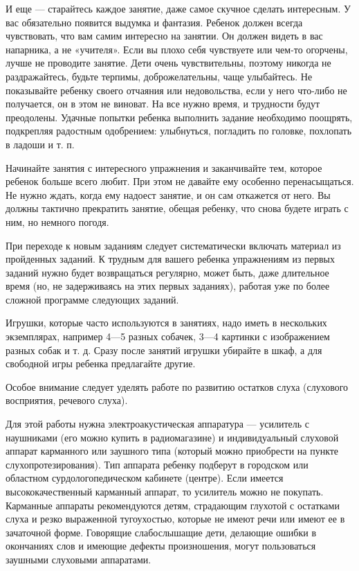 \documentclass{book}
\begin{document}
И еще --- старайтесь каждое занятие, даже самое скучное сделать
интересным. У вас обязательно появится выдумка и фантазия. Ребенок
должен всегда чувствовать, что вам самим интересно на занятии. Он должен
видеть в вас напарника, а не «учителя». Если вы плохо себя чувствуете
или чем-то огорчены, лучше не проводите занятие. Дети очень
чувствительны, поэтому никогда не раздражайтесь, будьте терпимы,
доброжелательны, чаще улыбайтесь. Не показывайте ребенку своего отчаяния
или недовольства, если у него что-либо не получается, он в этом не
виноват. На все нужно время, и трудности будут преодолены. Удачные
попытки ребенка выполнить задание необходимо поощрять, подкрепляя
радостным одобрением: улыбнуться, погладить по головке, похлопать в
ладоши и т. п.

Начинайте занятия с интересного упражнения и заканчивайте тем, которое
ребенок больше всего любит. При этом не давайте ему особенно
перенасыщаться. Не нужно ждать, когда ему надоест занятие, и он сам
откажется от него. Вы должны тактично прекратить занятие, обещая
ребенку, что снова будете играть с ним, но немного погодя.

При переходе к новым заданиям следует систематически включать материал
из пройденных заданий. К трудным для вашего ребенка упражнениям из
первых заданий нужно будет возвращаться регулярно, может быть, даже
длительное время (но, не задерживаясь на этих первых заданиях), работая
уже по более сложной программе следующих заданий.

Игрушки, которые часто используются в занятиях, надо иметь в нескольких
экземплярах, например 4---5 разных собачек, 3---4 картинки с
изображением разных собак и т. д. Сразу после занятий игрушки убирайте в
шкаф, а для свободной игры ребенка предлагайте другие.

Особое внимание следует уделять работе по развитию остатков слуха
(слухового восприятия, речевого слуха).

Для этой работы нужна электроакустическая аппаратура --- усилитель с
наушниками (его можно купить в радиомагазине) и индивидуальный слуховой
аппарат карманного или заушного типа (который можно приобрести на пункте
слухопротезирования). Тип аппарата ребенку подберут в городском или
областном сурдологопедическом кабинете (центре). Если имеется
высококачественный карманный аппарат, то усилитель можно не покупать.
Карманные аппараты рекомендуются детям, страдающим глухотой с остатками
слуха и резко выраженной тугоухостью, которые не имеют речи или имеют ее
в зачаточной форме. Говорящие слабослышащие дети, делающие ошибки в
окончаниях слов и имеющие дефекты произношения, могут пользоваться
заушными слуховыми аппаратами.
\end{document}

